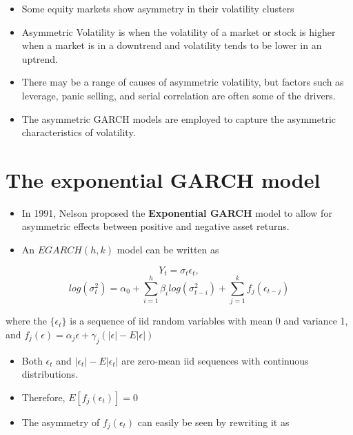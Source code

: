 \documentclass[]{book}
\providecommand{\tightlist}{%
  \setlength{\itemsep}{0pt}\setlength{\parskip}{0pt}}
\begin{document}
\begin{itemize}
\tightlist
\item
  Some equity markets show asymmetry in their volatility clusters
\item
  Asymmetric Volatility is when the volatility of a market or stock is higher when a market is in a downtrend and volatility tends to be lower in an uptrend.
\item
  There may be a range of causes of asymmetric volatility, but factors such as leverage, panic selling, and serial correlation are often some of the drivers.
\item
  The asymmetric GARCH models are employed to capture the asymmetric characteristics of volatility.
\end{itemize}

\hypertarget{the-exponential-garch-model}{%
\section{The exponential GARCH model}\label{the-exponential-garch-model}}

\begin{itemize}
\tightlist
\item
  In 1991, Nelson proposed the \textbf{Exponential GARCH} model to allow for asymmetric effects between positive and negative asset returns.
\item
  An \(EGARCH(h,k)\) model can be written as
\end{itemize}

\[Y_t=\sigma_t\epsilon_t,\]
\begin{equation} \label{eq:6}
log(\sigma_t^2) =\alpha_0+\sum_{i=1}^h\beta_ilog(\sigma_{t-i}^2)+ \sum_{j=1}^kf_j(\epsilon_{t-j})
\end{equation}

where the \(\{\epsilon_t\}\) is a sequence of iid random variables with mean 0 and variance 1, and \(f_j(\epsilon)=\alpha_j\epsilon+\gamma_j(|\epsilon|-E|\epsilon|)\)

\begin{itemize}
\tightlist
\item
  Both \(\epsilon_t\) and \(|\epsilon_t|-E|\epsilon_t|\) are zero-mean iid sequences with continuous distributions.
\item
  Therefore, \(E[f_j(\epsilon_t)]=0\)
\item
  The asymmetry of \(f_j(\epsilon_t)\) can easily be seen by rewriting it as
\end{itemize}
\end{document}
